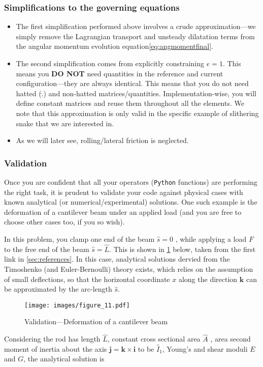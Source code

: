 \documentclass[11pt]{article}
\begin{document}
\subsubsection{Simplifications to the governing equations}
\label{sec:org1168e5a}
\begin{itemize}
\item The first simplification performed above involves a crude
approximation---we simply remove the Lagrangian transport and unsteady
dilatation terms from the angular momentum evolution equation\cref{eq:angmomentfinal}.
\item The second simplification comes from explicitly constraining \(e = 1\).
This means you \textbf{DO NOT} need quantities in the reference and current
configuration---they are always identical. This means that you do not
need hatted (\(\hat{.}\)) and non-hatted matrices/quantities.
Implementation-wise, you will define constant matrices and reuse them
throughout all the elements. We note that this approximation is only
valid in the specific example of slithering snake that we are interested in.
\item As we will later see, rolling/lateral friction is neglected.
\end{itemize}
\subsubsection{Validation}
\label{sec:orgec84bdc}
Once you are confident that all your operators (\texttt{Python}  functions) are
performing the right task, it is prudent to validate your code against
physical cases with known analytical (or numerical/experimental) solutions.
One such example is the deformation of a cantilever beam under an applied
load (and you are free to choose other cases too, if you so wish).

In this problem, you clamp one end of the beam \(\hat{s}=0\) , while applying a load \(F\) to the free end of the beam \(\hat{s}=\hat{L}\). This is shown in \cref{p1_fig} below, taken
 from the first link in \cref{sec:references}. In this case, analytical solutions dervied from the Timoshenko (and
 Euler-Bernoulli) theory exists, which relies on the assumption of small
 deflections, so that the horizontal coordinate \(x\) along the direction
 \(\mathbf{k}\) can be approximated by the arc-length \(\hat{s}\).

\begin{figure}[htbp]
\centering
\texttt{[image: images/figure\_11.pdf]}
\caption{\label{p1_fig}
Validation---Deformation of a cantilever beam}
\end{figure}
Considering the rod has length
 \(\hat{L}\), constant cross sectional area \(\hat{A}\) , area second moment of
 inertia about the axis \(\mathbf{j}=\mathbf{k}\times\mathbf{i}\) to be
 \(\hat{I}_1\), Young's and shear moduli \(E\) and \(G\), the analytical solution is
\end{document}
